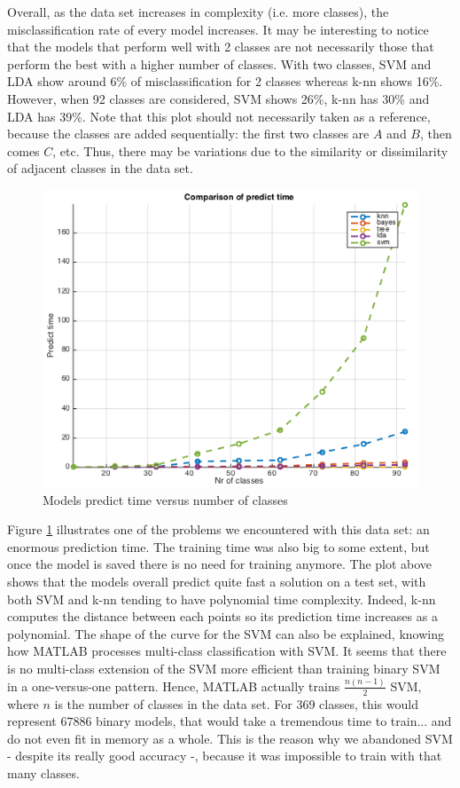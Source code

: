 \documentclass[twocolumn]{article}%
\begin{document}
	Overall, as the data set increases in complexity (i.e. more classes), the misclassification rate of every model increases. It may be interesting to notice that the models that perform well with 2 classes are not necessarily those that perform the best with a higher number of classes. With two classes, SVM and LDA show around 6\% of misclassification for 2 classes whereas k-nn shows 16\%. However, when 92 classes are considered, SVM shows 26\%, k-nn has 30\% and LDA has 39\%. Note that this plot should not necessarily taken as a reference, because the classes are added sequentially: the first two classes are $A$ and $B$, then comes $C$, etc. Thus, there may be variations due to the similarity or dissimilarity of adjacent classes in the data set. 
	
	
	\begin{figure}[h!]
	\centering
	\includegraphics[scale=0.45]{images/time_vs_nclasses.png}
	\caption{Models predict time versus number of classes}
	\label{timeVSnClasses}
	\end{figure}
	
	Figure \ref{timeVSnClasses} illustrates one of the problems we encountered with this data set: an enormous prediction time. The training time was also big to some extent, but once the model is saved there is no need for training anymore. The plot above shows that the models overall predict quite fast a solution on a test set, with both SVM and k-nn tending to have polynomial time complexity. Indeed, k-nn computes the distance between each points so its prediction time increases as a polynomial. The shape of the curve for the SVM can also be explained, knowing how MATLAB processes multi-class classification with SVM. It seems that there is no multi-class extension of the SVM more efficient than training binary SVM in a one-versus-one pattern. Hence, MATLAB actually trains $\frac{n(n-1)}{2}$ SVM, where $n$ is the number of classes in the data set. For 369 classes, this would represent $67886$ binary models, that would take a tremendous time to train... and do not even fit in memory as a whole. This is the reason why we abandoned SVM - despite its really good accuracy -, because it was impossible to train with that many classes.
	
\end{document}

